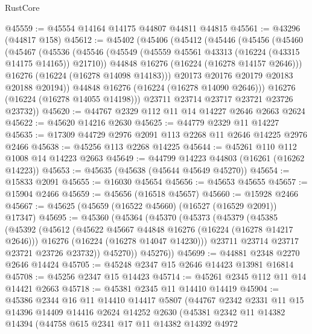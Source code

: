 \begin{lexlean}{RustCore}
\begin{coremodule}
@45559 := @45554 @14164 @14175 @44807 @44811 @44815
@45561 := @43296 (@44817 @158)
@45612 := @45402
    (@45406
      (@45412
        (@45446
          (@45456
            (@45460
              (@45467
                (@45536
                  (@45546
                    (@45549 (@45559 @45561 @43313 (@16224 (@43315 @14175 @14165)) @21710))
                    @44848
                    @16276
                    (@16224 (@16278 @14157 @2646)))
                  @16276
                  (@16224 (@16278 @14098 @14183)))
                @20173
                @20176
                @20179
                @20183
                @20188
                @20194))
            @44848
            @16276
            (@16224 (@16278 @14090 @2646)))
          @16276
          (@16224 (@16278 @14055 @14198)))
        @23711
        @23714
        @23717
        @23721
        @23726
        @23732))
@45620 := @44767 @2329 @112 @11 @14 @14227 @2646 @2663 @2624
@45622 := @45620 @14216 @2630
@45625 := @44779 @2329 @11 @14227
@45635 := @17309 @44729 @2976 @2091 @113 @2268 @11 @2646 @14225 @2976 @2466
@45638 := @45256 @113 @2268 @14225
@45644 := @45261 @110 @112 @1008 @14 @14223 @2663
@45649 := @44799 @14223 @44803 (@16261 (@16262 @14223))
@45653 := @45635 (@45638 (@45644 @45649 @45270))
@45654 := @15833 @2091
@45655 := @16030 @45654
@45656 := @45653 @45655
@45657 := @15904 @2466
@45659 := @45656 (@16518 @45657)
@45660 := @15928 @2466
@45667 := @45625 (@45659 (@16522 @45660) (@16527 (@16529 @2091)) @17347)
@45695 := @45360
    (@45364
      (@45370
        (@45373
          (@45379
            (@45385
              (@45392
                (@45612
                  (@45622 @45667 @44848 @16276 (@16224 (@16278 @14217 @2646)))
                  @16276
                  (@16224 (@16278 @14047 @14230)))
                @23711
                @23714
                @23717
                @23721
                @23726
                @23732))
            @45270))
        @45276))
@45699 := @44881 @2348 @2270 @2646 @14424
@45705 := @45248 @2347 @15 @2646 @14423 @13981 @16814
@45708 := @45256 @2347 @15 @14423
@45714 := @45261 @2345 @112 @11 @14 @14421 @2663
@45718 := @45381 @2345 @11 @14410 @14419
@45904 := @45386
    @2344
    @16
    @11
    @14410
    @14417
    @5807
    (@44767
      @2342
      @2331
      @11
      @15
      @14396
      @14409
      @14416
      @2624
      @14252
      @2630
      (@45381
        @2342
        @11
        @14382
        @14394
        (@44758
          @615
          @2341
          @17
          @11
          @14382
          @14392
          @4972

\end{coremodule}
\end{lexlean}
